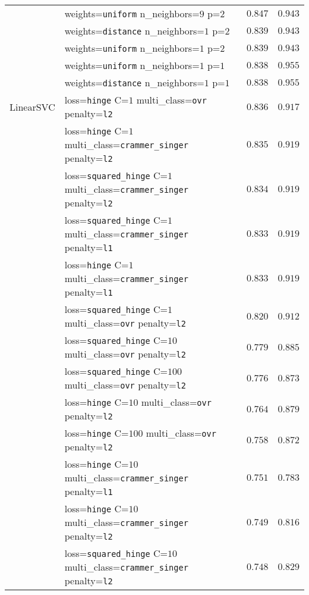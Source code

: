 \begin{longtable}{llrr}
& \tiny{weights=\texttt{uniform} n\_neighbors=$9$ p=$2$} &$0.847$ & $0.943$\\
& \tiny{weights=\texttt{distance} n\_neighbors=$1$ p=$2$} &$0.839$ & $0.943$\\
& \tiny{weights=\texttt{uniform} n\_neighbors=$1$ p=$2$} &$0.839$ & $0.943$\\
& \tiny{weights=\texttt{uniform} n\_neighbors=$1$ p=$1$} &$0.838$ & $0.955$\\
& \tiny{weights=\texttt{distance} n\_neighbors=$1$ p=$1$} &$0.838$ & $0.955$\\
\midrule
LinearSVC & \tiny{loss=\texttt{hinge} C=$1$ multi\_class=\texttt{ovr} penalty=\texttt{l2}} &$0.836$ & $0.917$\\
& \tiny{loss=\texttt{hinge} C=$1$ multi\_class=\texttt{crammer\_singer} penalty=\texttt{l2}} &$0.835$ & $0.919$\\
& \tiny{loss=\texttt{squared\_hinge} C=$1$ multi\_class=\texttt{crammer\_singer} penalty=\texttt{l2}} &$0.834$ & $0.919$\\
& \tiny{loss=\texttt{squared\_hinge} C=$1$ multi\_class=\texttt{crammer\_singer} penalty=\texttt{l1}} &$0.833$ & $0.919$\\
& \tiny{loss=\texttt{hinge} C=$1$ multi\_class=\texttt{crammer\_singer} penalty=\texttt{l1}} &$0.833$ & $0.919$\\
& \tiny{loss=\texttt{squared\_hinge} C=$1$ multi\_class=\texttt{ovr} penalty=\texttt{l2}} &$0.820$ & $0.912$\\
& \tiny{loss=\texttt{squared\_hinge} C=$10$ multi\_class=\texttt{ovr} penalty=\texttt{l2}} &$0.779$ & $0.885$\\
& \tiny{loss=\texttt{squared\_hinge} C=$100$ multi\_class=\texttt{ovr} penalty=\texttt{l2}} &$0.776$ & $0.873$\\
& \tiny{loss=\texttt{hinge} C=$10$ multi\_class=\texttt{ovr} penalty=\texttt{l2}} &$0.764$ & $0.879$\\
& \tiny{loss=\texttt{hinge} C=$100$ multi\_class=\texttt{ovr} penalty=\texttt{l2}} &$0.758$ & $0.872$\\
& \tiny{loss=\texttt{hinge} C=$10$ multi\_class=\texttt{crammer\_singer} penalty=\texttt{l1}} &$0.751$ & $0.783$\\
& \tiny{loss=\texttt{hinge} C=$10$ multi\_class=\texttt{crammer\_singer} penalty=\texttt{l2}} &$0.749$ & $0.816$\\
& \tiny{loss=\texttt{squared\_hinge} C=$10$ multi\_class=\texttt{crammer\_singer} penalty=\texttt{l2}} &$0.748$ & $0.829$\\

\end{longtable}
